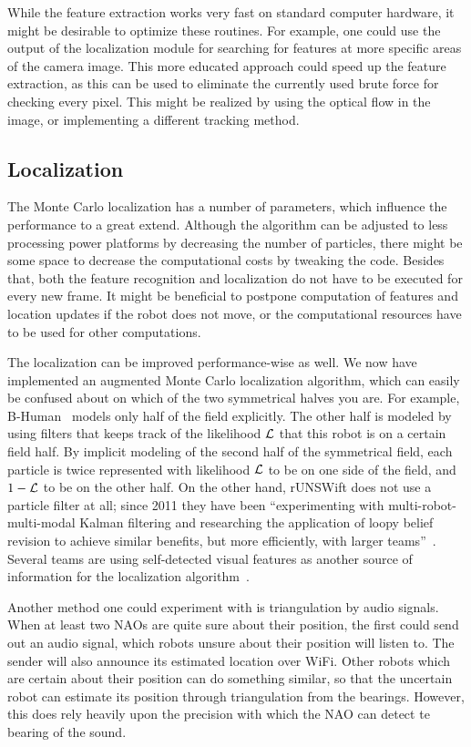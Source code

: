\documentclass[	DIV=calc,%
							paper=a4,%
							fontsize=9pt,%
							twocolumn]{scrartcl}	 					%
\begin{document}
While the feature extraction works very fast on standard computer hardware, it might be desirable to optimize these routines. For example, one could use the output of the localization module for searching for features at more specific areas of the camera image.  This more educated approach could speed up the feature extraction, as this can be used to eliminate the currently used brute force for checking every pixel.  This might be realized by using the optical flow in the image, or implementing a different tracking method.

\subsection{Localization}
The Monte Carlo localization has a number of parameters, which influence the performance to a great extend.
Although the algorithm can be adjusted to less processing power platforms by decreasing the number of particles, there might be some space to decrease the computational costs by tweaking the code.
Besides that, both the feature recognition and localization do not have to be executed for every new frame. It might be beneficial to postpone computation of features and location updates if the robot does not move, or the computational resources have to be used for other computations.

The localization can be improved performance-wise as well.  We now have implemented an augmented Monte Carlo localization algorithm, which can easily be confused about on which of the two symmetrical halves you are.  For example, B-Human~\cite{TeamReportB-Human} models only half of the field explicitly.  The other half is modeled by using filters that keeps track of the likelihood ${\cal L}$ that this robot is on a certain field half.  By implicit modeling of the second half of the symmetrical field, each particle is twice represented with likelihood ${\cal L}$ to be on one side of the field, and $1 - {\cal L}$ to be on the other half.  On the other hand, rUNSWift does not use a particle filter at all; since 2011 they have been ``experimenting with multi-robot-multi-modal Kalman filtering and researching the application of loopy belief revision to achieve similar benefits, but more efficiently, with larger teams''~\cite{rUNSWift-TD-11}.  Several teams are using self-detected visual features as another source of information for the localization algorithm~\cite{sturm2006msc,Cuauhpipiltin-TD12}.

Another method one could experiment with is triangulation by audio signals.  When at least two NAOs are quite sure about their position, the first could send out an audio signal, which robots unsure about their position will listen to.  The sender will also announce its estimated location over WiFi. Other robots which are certain about their position can do something similar, so that the uncertain robot can estimate its position through triangulation from the bearings.  However, this does rely heavily upon the precision with which the NAO can detect te bearing of the sound.
\end{document}
